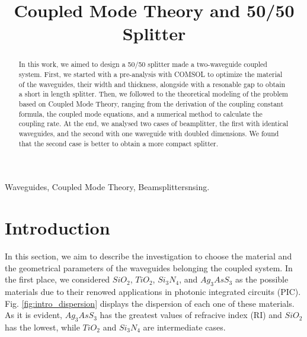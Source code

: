 \documentclass[conference, a4paper]{IEEEtran}
\begin{document}
\title{Coupled Mode Theory and 50/50 Splitter}

\author{
\and
{}
}

\maketitle

\begin{abstract}
    In this work, we aimed to design a 50/50 splitter made a two-waveguide coupled system. First, we started with a pre-analysis with COMSOL to optimize the material of the waveguides, their width and thickness, alongside with a resonable gap to obtain a short in length splitter. Then, we followed to the theoretical modeling of the problem based on Coupled Mode Theory, ranging from the derivation of the coupling constant formula, the coupled mode equations, and a numerical method to calculate the coupling rate. At the end, we analysed two cases of beamplitter, the first with identical waveguides, and the second with one waveguide with doubled dimensions. We found that the second case is better to obtain a more compact splitter.
\end{abstract}

\begin{IEEEkeywords}
    Waveguides, Coupled Mode Theory, Beamsplittersnsing.
\end{IEEEkeywords}

\section{Introduction}
\label{sec:intro}

In this section, we aim to describe the investigation to choose the material and the geometrical parameters of the waveguides belonging the coupled system. In the first place, we considered $SiO_2$, $TiO_2$, $Si_3N_4$, and $Ag_3AsS_3$ as the possible materials due to their renowed applications in photonic integrated circuits (PIC). Fig. \ref{fig:intro_dispersion} displays the dispersion of each one of these materials. As it is evident, $Ag_3AsS_3$ has the greatest values of refracive index (RI) and $SiO_2$ has the lowest, while $TiO_2$ and $Si_3N_4$ are intermediate cases. 
\end{document}
